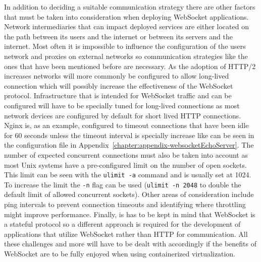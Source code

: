 In addition to deciding a suitable communication strategy there are other factors that must be taken into consideration when deploying WebSocket applications. Network intermediaries that can impact deployed services are either located on the path between its users and the internet or between its servers and the internet. Most often it is impossible to influence the configuration of the users network and proxies on external networks so communication strategies like the ones that have been mentioned before are necessary. As the adoption of HTTP/2 increases networks will more commonly be configured to allow long-lived connection which will possibly increase the effectiveness of the WebSocket protocol. Infrastructure that is intended for WebSocket traffic and can be configured will have to be specially tuned for long-lived connections as most network devices are configured by default for short lived HTTP connections. Nginx is, as an example, configured to timeout connections that have been idle for 60 seconds unless the timeout interval is specially increase like can be seen in the configuration file in Appendix~\ref{chapter:appendix-websocketEchoServer}. The number of expected concurrent connections must also be taken into account as most Unix systems have a pre-configured limit on the number of open sockets. This limit can be seen with the \texttt{ulimit -a} command and is usually set at 1024. To increase the limit the \texttt{-n} flag can be used (\texttt{ulimit -n 2048} to double the default limit of allowed concurrent sockets). Other areas of consideration include ping intervals to prevent connection timeouts and identifying where throttling might improve performance. Finally, is has to be kept in mind that WebSocket is a stateful protocol so a different approach is required for the development of applications that utilize WebSocket rather than HTTP for communication. All these challenges and more will have to be dealt with accordingly if the benefits of WebSocket are to be fully enjoyed when using containerized virtualization.